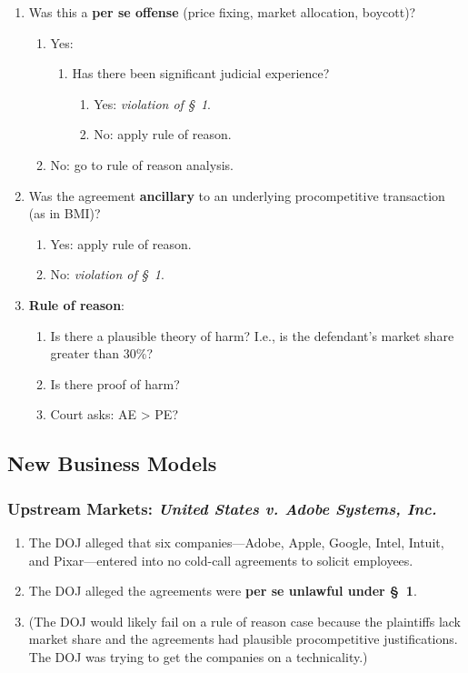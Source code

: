 \begin{enumerate}
    \item Was this a \textbf{per se offense} (price fixing, market allocation, 
    boycott)?
    \begin{enumerate}
        \item Yes:
        \begin{enumerate}
            \item Has there been significant judicial experience?
            \begin{enumerate}
                \item Yes: \emph{violation of \S\ 1}.
                \item No: apply rule of reason.
            \end{enumerate}
        \end{enumerate}
        \item No: go to rule of reason analysis.
    \end{enumerate}
    \item Was the agreement \textbf{ancillary} to an underlying procompetitive 
    transaction (as in BMI)?
    \begin{enumerate}
        \item Yes: apply rule of reason.
        \item No: \emph{violation of \S\ 1}.
    \end{enumerate}
    \item \textbf{Rule of reason}:
    \begin{enumerate}
        \item Is there a plausible theory of harm? I.e., is the defendant's 
        market share greater than 30\%?
        \item Is there proof of harm?
        \item Court asks: AE > PE?
    \end{enumerate}
\end{enumerate}

\subsection{New Business Models}

\subsubsection{Upstream Markets: \emph{United States v. Adobe Systems, Inc.}}

\begin{enumerate}
    \item The DOJ alleged that six companies---Adobe, Apple, Google, Intel, 
    Intuit, and Pixar---entered into no cold-call agreements to solicit 
    employees.
    \item The DOJ alleged the agreements were \textbf{per se unlawful under \S\ 
    1}.
    \item (The DOJ would likely fail on a rule of reason case because the 
    plaintiffs lack market share and the agreements had plausible procompetitive 
    justifications. The DOJ was trying to get the companies on a technicality.)
\end{enumerate}

